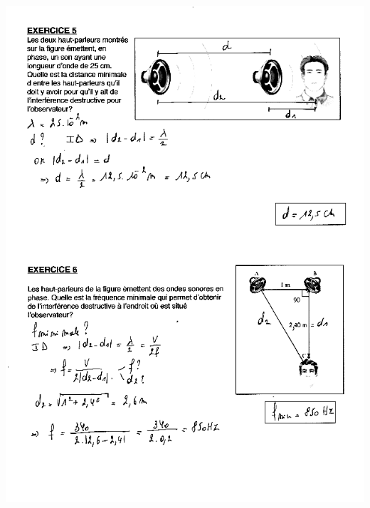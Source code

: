 \includegraphics[width=18.253cm,height=25.273cm]{Pictures/1000000100000270000003604BA27A8CAE787E63.png}
